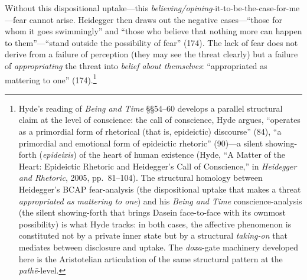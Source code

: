 \documentclass{article}
\begin{document}
Without this dispositional uptake---this \textit{believing/opining}-it-to-be-the-case-for-me---fear cannot arise. Heidegger then draws out the negative cases---``those for whom it goes swimmingly'' and ``those who believe that nothing more can happen to them''---``stand outside the possibility of fear'' (174). The lack of fear does not derive from a failure of perception (they may see the threat clearly) but a failure of \textit{appropriating} the threat into \textit{belief about themselves}: ``appropriated as mattering to one'' (174).\footnote{Hyde's reading of \textit{Being and Time} \S\S 54--60 develops a parallel structural claim at the level of conscience: the call of conscience, Hyde argues, ``operates as a primordial form of rhetorical (that is, epideictic) discourse'' (84), ``a primordial and emotional form of epideictic rhetoric'' (90)---a silent showing-forth (\textit{epideixis}) of the heart of human existence (Hyde, ``A Matter of the Heart: Epideictic Rhetoric and Heidegger's Call of Conscience,'' in \textit{Heidegger and Rhetoric}, 2005, pp.~81--104). The structural homology between Heidegger's BCAP fear-analysis (the dispositional uptake that makes a threat \textit{appropriated as mattering to one}) and his \textit{Being and Time} conscience-analysis (the silent showing-forth that brings Dasein face-to-face with its ownmost possibility) is what Hyde tracks: in both cases, the affective phenomenon is constituted not by a private inner state but by a structural \textit{taking-on} that mediates between disclosure and uptake. The \textit{doxa}-gate machinery developed here is the Aristotelian articulation of the same structural pattern at the \textit{pathē}-level.}
\end{document}
